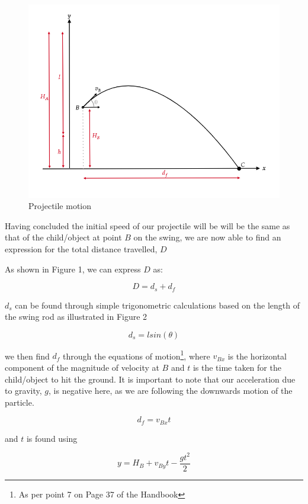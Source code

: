 \documentclass{article}
\begin{document}
\begin{figure}[H]
    \centering
    \includegraphics[width=0.70\linewidth]{Fig 3.png}
    \caption{Projectile motion}
    \label{fig: Projectile motion diagram}
\end{figure}

Having concluded the initial speed of our projectile will be will be the same as that of the child/object at point $B$ on the swing, we are now able to find an expression for the total distance travelled, $D$
\par
\noindent As shown in Figure 1, we can express $D$ as:

\begin{equation}
    D = d_s + d_f
\end{equation}

$d_s$ can be found through simple trigonometric calculations based on the length of the swing rod as illustrated in Figure 2

\begin{equation}
    d_s = lsin(\theta)
\end{equation}

we then find $d_f$ through the equations of motion\footnote{As per point 7 on Page 37 of the Handbook}, where $v_{Bx}$ is the horizontal component of the magnitude of velocity at $B$ and $t$ is the time taken for the child/object to hit the ground. It is important to note that our acceleration due to gravity, $g$, is negative here, as we are following the downwards motion of the particle.

\begin{equation}
    d_f = v_{Bx}t
\end{equation}

and $t$ is found using

\begin{equation}
    y = H_B + v_{By}t - \frac{gt^2}{2}
\end{equation}
\end{document}
